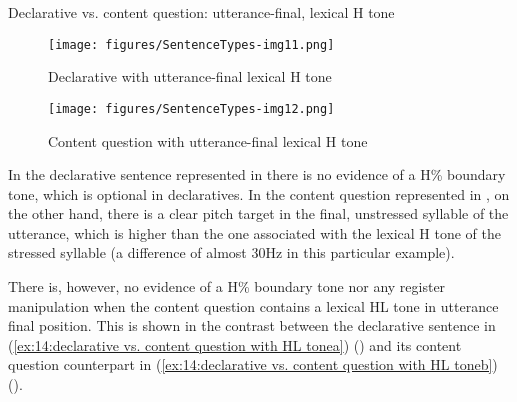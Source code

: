 \ea\label{ex:14:declarative vs. content question with H tone}
{Declarative vs. content question: utterance-final, lexical H tone}

 \label{ex:14:declarative vs. content question with H tonea}
        \label{ex:14:declarative vs. content question with H toneb}
    \z
\z

\begin{figure}
\texttt{[image: figures/SentenceTypes-img11.png]}
\caption{
\label{fig: declarative with H tone}
Declarative with utterance-final lexical H tone}
\end{figure}

\begin{figure}
\texttt{[image: figures/SentenceTypes-img12.png]}
\caption{
\label{fig: content question lexical H tone}
Content question with utterance-final lexical H tone}
\end{figure}

In the declarative sentence represented in  there is no evidence of a H\% boundary tone, which is optional in declaratives. In the content question represented in , on the other hand, there is a clear pitch target in the final, unstressed syllable of the utterance, which is higher than the one associated with the lexical H tone of the stressed syllable (a difference of almost 30Hz in this particular example).

There is, however, no evidence of a H\% boundary tone nor any register manipulation when the content question contains a lexical HL tone in utterance final position. This is shown in the contrast between the declarative sentence in (\ref{ex:14:declarative vs. content question with HL tonea}) () and its content question counterpart in (\ref{ex:14:declarative vs. content question with HL toneb}) ().

